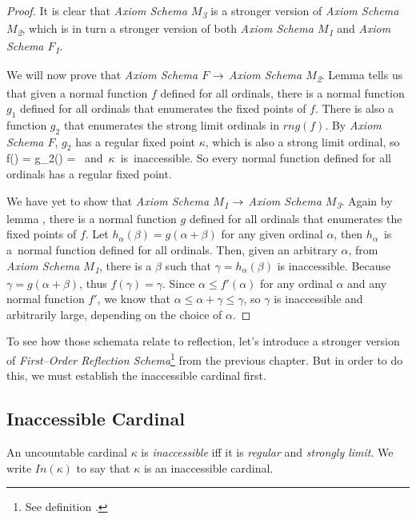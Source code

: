 \begin{proof}
It is clear that \emph{Axiom Schema $M$\textsubscript{3}} is a stronger version of \emph{Axiom Schema $M$\textsubscript{2}}, which is in turn a stronger version of both \emph{Axiom Schema $M$\textsubscript{1}} and \emph{Axiom Schema $F$\textsubscript{1}}. 

We will now prove that \emph{Axiom Schema $F$} $\rightarrow$ \emph{Axiom Schema $M$\textsubscript{2}}. 
Lemma  tells us that given a normal function $f$ defined for all ordinals, 
there is a normal function $g_1$ defined for all ordinals that enumerates the fixed points of $f$. 
There is also a function $g_2$ that enumerates the strong limit ordinals in $rng(f)$.
By \emph{Axiom Schema $F$}, $g_2$ has a regular fixed point $\kappa$, which is also a strong limit ordinal, so 
\beq
f(\kappa) = g_2(\kappa) = \kappa \mbox{ and $\kappa$ is inaccessible.} 
\eeq
So every normal function defined for all ordinals has a regular fixed point.

We have yet to show that \emph{Axiom Schema $M$\textsubscript{1}} $\rightarrow$ \emph{Axiom Schema $M$\textsubscript{3}}. Again by lemma , there is a normal function $g$ defined for all ordinals that enumerates the fixed points of $f$. Let $h_\alpha(\beta) = g(\alpha+\beta)$ for any given ordinal $\alpha$, then $h_\alpha$~is a~normal function defined for all ordinals.
Then, given an arbitrary $\alpha$, from \emph{Axiom Schema $M$\textsubscript{1}}, there is a $\beta$ such that $\gamma = h_\alpha(\beta)$ is inaccessible. 
Because $\gamma = g(\alpha+\beta)$, thus $f(\gamma) = \gamma$. 
Since $\alpha \leq f'(\alpha)$ for any ordinal $\alpha$ and any normal function $f'$, we know that $\alpha \leq \alpha + \gamma \leq \gamma$, so $\gamma$ is inaccessible and arbitrarily large, depending on the choice of $\alpha$.
\end{proof}

To see how those schemata relate to reflection, let's introduce a stronger version of \emph{First–Order Reflection Schema}\footnote{See definition .} from the previous chapter. 
But in order to do this, we must establish the inaccessible cardinal first.

\subsection{Inaccessible Cardinal}\label{sec:inaccessible}
\begin{definition}
An uncountable cardinal $\kappa$ is \emph{inaccessible} iff it is \emph{regular} and \emph{strongly limit}. We write $In(\kappa)$ to say that $\kappa$ is an inaccessible cardinal.
\end{definition}

